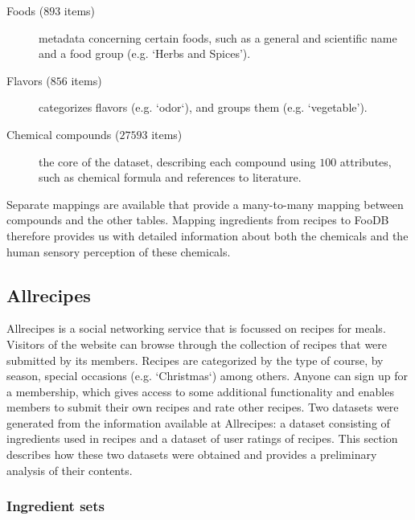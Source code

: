 \begin{description}
	\item [Foods ($893$ items)] metadata concerning certain foods, such as a general and scientific name and a food group (e.g. `Herbs and Spices').
	\item [Flavors ($856$ items)] categorizes flavors (e.g. `odor`), and groups them (e.g. `vegetable').
	\item [Chemical compounds ($\num{27593}$ items)] the core of the dataset, describing each compound using $100$ attributes, such as chemical formula and references to literature.
\end{description}

Separate mappings are available that provide a many-to-many mapping between compounds and the other tables.
Mapping ingredients from recipes to FooDB therefore provides us with detailed information about both the chemicals and the human sensory perception of these chemicals.


\subsection{Allrecipes}
\label{subsec:allrecipes}

Allrecipes is a social networking service that is focussed on recipes for meals.
Visitors of the website can browse through the collection of recipes that were submitted by its members.
Recipes are categorized by the type of course, by season, special occasions (e.g. `Christmas`) among others.
Anyone can sign up for a membership, which gives access to some additional functionality and enables members to submit their own recipes and rate other recipes.
Two datasets were generated from the information available at Allrecipes: a dataset consisting of ingredients used in recipes and a dataset of user ratings of recipes.
This section describes how these two datasets were obtained and provides a preliminary analysis of their contents.


\subsubsection{Ingredient sets}
\label{subsubsec:ingredient_sets}

